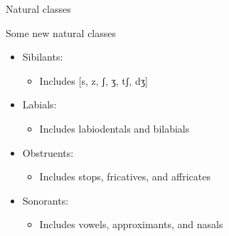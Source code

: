 \documentclass{beamer}
\newcommand{\subonetwo}{Natural classes}
\begin{document}
\begin{frame}[t]{\subonetwo}
{\begin{block}{Some new natural classes}
\begin{itemize}
              \item \alert{Sibilants}: 
              \begin{itemize}
                \item Includes [s, z, ʃ, ʒ, tʃ, dʒ]
              \end{itemize}
              \item<8-> \alert{Labials}: 
              \begin{itemize}
                \item Includes labiodentals and bilabials
              \end{itemize}
              \item<9-> \alert{Obstruents}: 
              \begin{itemize}
                \item Includes stops, fricatives, and affricates
              \end{itemize}
              \item<10-> \alert{Sonorants}: 
              \begin{itemize}
                \item Includes vowels, approximants, and nasals
              \end{itemize}
            \end{itemize}
          \end{block}
        }
      \end{frame}
\end{document}
